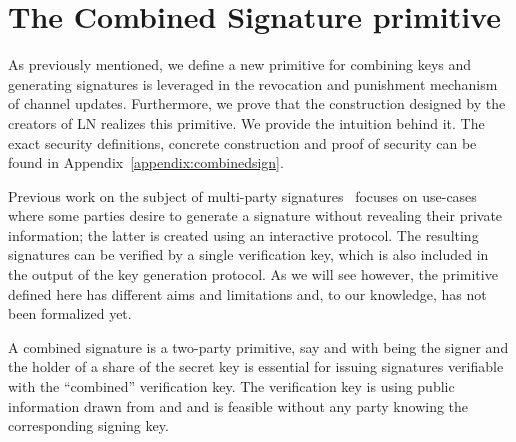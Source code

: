 \section{The Combined Signature primitive}
\label{sec:ov-combined-ds}
  As previously mentioned, we define a new primitive for combining keys and
  generating signatures is leveraged in the revocation and
  punishment mechanism of channel updates. Furthermore, we prove that the
  construction designed by the creators of LN realizes this primitive. We
  provide 
  the intuition behind it. The exact security definitions, concrete construction
  and proof of security can be found in Appendix~\ref{appendix:combinedsign}.

  Previous work on the subject of multi-party
signatures~\cite{DBLP:conf/ndss/NicolosiKDM03,DBLP:journals/iacr/BellareS01,boyd1986digital,DBLP:conf/ndss/Ganesan95a,DBLP:conf/crypto/MacKenzieR01,ganesan1994secure}
  focuses on use-cases where some parties desire to generate a signature without
  revealing their private information; the latter is created using an
  interactive protocol. The resulting signatures can be verified by a single
  verification key, which is also included in the output of the key generation
  protocol. As we will see however, the primitive defined here has different
  aims and limitations and, to our knowledge, has not been formalized yet.

  A combined signature is a two-party primitive, say  \alice{}
  and \bob\redden{,} with \bob{} being the signer and \alice{} the holder of a
  share of the secret key is essential for issuing
  signatures verifiable with the ``combined''
  verification key. The verification key is  using public
  information drawn from \alice{} and \bob{} and is feasible without any party
  knowing the corresponding signing key. 

